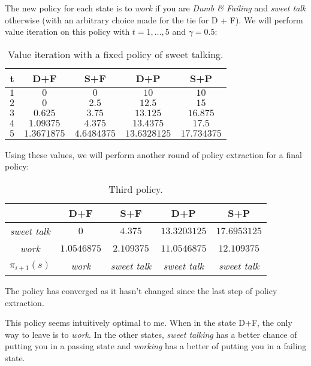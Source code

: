 \documentclass[fleqn]{hw}
\begin{document}
\begin{enumerate}
The new policy for each state is to {\it work} if you are {\it Dumb \& Failing} and {\it sweet talk} otherwise (with an arbitrary choice made for the tie for D + F). We will perform value iteration on this policy with $t = 1,\dots,5$ and $\gamma = 0.5$:

\begin{table}[H]
\centering
\begin{tabular}{|c||c|c|c|c|}
\hline
{\bf t} & D+F & S+F & D+P & S+P \\
\hline
$1$ & $0$ & $0$ & $10$ & $10$ \\
\hline
$2$ & $0$ & $2.5$ & $12.5$ & $15$ \\
\hline
$3$ & $0.625$ & $3.75$ & $13.125$ & $16.875$ \\
\hline
$4$ & $1.09375$ & $4.375$ & $13.4375$ & $17.5$ \\
\hline
$5$ & $1.3671875$ & $4.6484375$ & $13.6328125$ & $17.734375$ \\
\hline
\end{tabular}
\caption{Value iteration with a fixed policy of sweet talking.}
\end{table}

Using these values, we will perform another round of policy extraction for a final policy:

\begin{table}[H]
\centering
\begin{tabular}{|c||c|c|c|c|}
\hline
 & D+F & S+F & D+P & S+P \\
\hline
{\it sweet talk} & $0$ & $4.375$  & $13.3203125$  & $17.6953125$ \\ \hline
{\it work} & $1.0546875$ & $2.109375$ & $11.0546875$ & $12.109375$ \\ \hline
$\pi_{i+1}(s)$ & {\it work} & {\it sweet talk} & {\it sweet talk} & {\it sweet talk} \\
\hline
\end{tabular}
\caption{Third policy.}
\end{table}

The policy has converged as it hasn't changed since the last step of policy extraction. 

This policy seems intuitively optimal to me. When in the state D+F, the only way to leave is to {\it work}. In the other states, {\it sweet talking} has a better chance of putting you in a passing state and {\it working} has a better of putting you in a failing state.

\end{enumerate}
\end{document}

